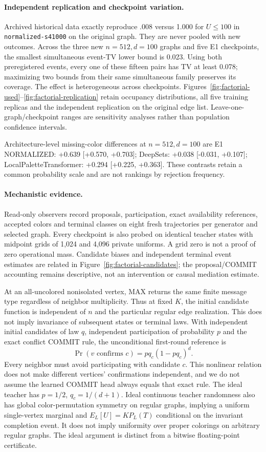 \paragraph{Independent replication and checkpoint variation.}
Archived historical data exactly reproduce .008 versus 1.000 for $U\le100$
in \texttt{normalized-s41000} on the original graph. They are never pooled
with new outcomes. Across the three new $n=512,d=100$ graphs and five E1
checkpoints, the smallest simultaneous event-TV lower bound is 0.023.
Using both preregistered events, every one of these fifteen pairs has TV at
least 0.078; maximizing two bounds from their same simultaneous family
preserves its coverage. The effect is heterogeneous across checkpoints.
Figures~\ref{fig:factorial-used}--\ref{fig:factorial-replication}
retain occupancy distributions, all five training replicas and the independent
replication on the original edge list. Leave-one-graph/checkpoint ranges are
sensitivity analyses rather than population confidence intervals.

Architecture-level missing-color differences at $n=512,d=100$ are E1 NORMALIZED: +0.639 [+0.570, +0.703]; DeepSets: +0.038 [-0.031, +0.107]; LocalPaletteTransformer: +0.294 [+0.225, +0.363]. These contrasts retain a common probability scale and are not rankings by rejection frequency.

\paragraph{Mechanistic evidence.}
Read-only observers record proposals, participation, exact availability
references, accepted colors and terminal classes on eight fresh trajectories
per generator and selected graph. Every checkpoint is also probed on identical
teacher states with midpoint grids of 1,024 and 4,096 private uniforms. A grid
zero is not a proof of zero operational mass. Candidate biases and independent
terminal event estimates are related in Figure~\ref{fig:factorial-candidates};
the proposal/COMMIT accounting remains descriptive, not an intervention or
causal mediation estimate.

At an all-uncolored nonisolated vertex, MAX returns the same finite message
type regardless of neighbor multiplicity. Thus at fixed $K$, the initial
candidate function is independent of $n$ and the particular regular edge
realization. This does not imply invariance of subsequent states or terminal
laws. With independent initial candidates of law $q$, independent participation
of probability $p$ and the exact conflict COMMIT rule, the unconditional first-round reference is
\[
 \Pr(v\text{ confirms }c)=p q_c(1-p q_c)^d.
\]
Every neighbor must avoid participating with candidate $c$. This nonlinear
relation does not make different vertices' confirmations independent, and
we do not assume the learned COMMIT head always equals that exact rule.
The ideal teacher has $p=1/2$, $q_c=1/(d+1)$.
Ideal continuous teacher randomness also has global color-permutation
symmetry on regular graphs, implying a uniform single-vertex marginal and
$E_L[U]=K P_L(T)$ conditional on the invariant completion event. It does not
imply uniformity over proper colorings on arbitrary regular graphs. The ideal
argument is distinct from a bitwise floating-point certificate.

